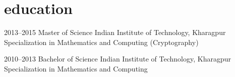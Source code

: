 \documentclass[print]{friggeri-cv} %
\begin{document}

\section{education}

\begin{entrylist}


\entry
{2013--2015}
{Master {\normalfont of Science}}
{Indian Institute of Technology, Kharagpur}
{Specialization in Mathematics and Computing (Cryptography)}


\entry
{2010--2013}
{Bachelor {\normalfont of Science}}
{Indian Institute of Technology, Kharagpur}
{Specialization in Mathematics and Computing}


\end{entrylist}
\end{document}

